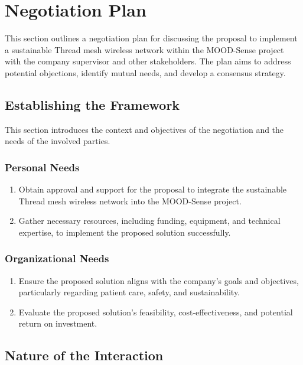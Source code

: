 \chapter{Negotiation Plan}\label{chap:negotiation_plan}

This section outlines a negotiation plan for discussing the proposal to implement a sustainable Thread mesh wireless network within the MOOD-Sense project with the company supervisor and other stakeholders. The plan aims to address potential objections, identify mutual needs, and develop a consensus strategy.


\section{Establishing the Framework}

This section introduces the context and objectives of the negotiation and the needs of the involved parties.


\subsection*{Personal  Needs}

\begin{enumerate}
    \item Obtain approval and support for the proposal to integrate the sustainable Thread mesh wireless network into the MOOD-Sense project.
    \item Gather necessary resources, including funding, equipment, and technical expertise, to implement the proposed solution successfully.
\end{enumerate}

\subsection*{Organizational Needs}

\begin{enumerate}
    \item Ensure the proposed solution aligns with the company's goals and objectives, particularly regarding patient care, safety, and sustainability.
    \item Evaluate the proposed solution's feasibility, cost-effectiveness, and potential return on investment.
\end{enumerate}


\section{Nature of the Interaction}

